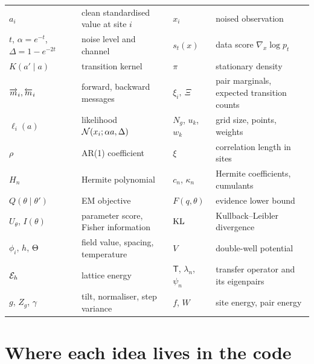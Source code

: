 \begin{center}\small
\begin{tabular}{@{}lp{4.6cm}@{\quad}lp{4.6cm}@{}}
\toprule
$a_i$ & clean standardised value at site $i$ & $x_i$ & noised observation \\
$t$, $\alpha=e^{-t}$, $\Delta=1-e^{-2t}$ & noise level and channel & $s_t(x)$ & data score $\nabla_x\log p_t$ \\
$K(a'\mid a)$ & transition kernel & $\pi$ & stationary density \\
$\overrightarrow{m}_i,\overleftarrow{m}_i$ & forward, backward messages & $\xi_i,\ \Xi$ & pair marginals, expected transition counts \\
$\ell_i(a)$ & likelihood $\mathcal{N}(x_i;\alpha a,\Delta)$ & $N_g$, $u_k$, $w_k$ & grid size, points, weights \\
$\rho$ & AR(1) coefficient & $\xi$ & correlation length in sites \\
$H_n$ & Hermite polynomial & $c_n$, $\kappa_n$ & Hermite coefficients, cumulants \\
$Q(\theta\mid\theta')$ & EM objective & $F(q,\theta)$ & evidence lower bound \\
$U_\theta$, $I(\theta)$ & parameter score, Fisher information & $\mathrm{KL}$ & Kullback--Leibler divergence \\
$\phi_i$, $h$, $\Theta$ & field value, spacing, temperature & $V$ & double-well potential \\
$\mathcal{E}_h$ & lattice energy & $\mathsf T$, $\lambda_n$, $\psi_n$ & transfer operator and its eigenpairs \\
$g$, $Z_g$, $\gamma$ & tilt, normaliser, step variance & $f$, $W$ & site energy, pair energy \\
\bottomrule
\end{tabular}
\end{center}

\section{Where each idea lives in the code}


